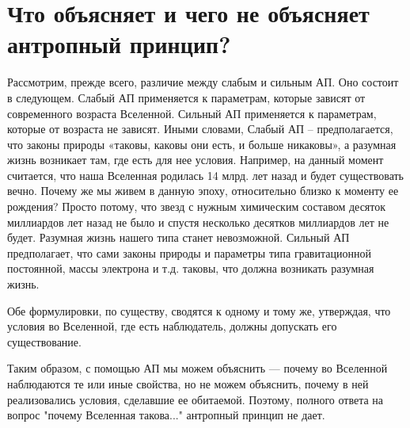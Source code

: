 \chapter{ Что объясняет и чего не объясняет антропный принцип?} \label{chapt5}

Рассмотрим, прежде всего, различие между слабым и сильным АП. Оно состоит в следующем. Слабый АП применяется к параметрам, которые зависят от современного возраста Вселенной. Сильный АП применяется к параметрам, которые от возраста не зависят. Иными словами, Слабый АП – предполагается, что законы природы «таковы, каковы они есть, и больше никаковы», а разумная жизнь возникает там, где есть для нее условия. Например, на данный момент считается, что наша Вселенная родилась 14 млрд. лет назад и будет существовать вечно. Почему же мы живем в данную эпоху, относительно близко к моменту ее рождения? Просто потому, что звезд с нужным химическим составом десяток миллиардов лет назад не было и спустя несколько десятков миллиардов лет не будет. Разумная жизнь нашего типа станет невозможной. Сильный АП предполагает, что сами законы природы и параметры типа гравитационной постоянной, массы электрона и т.д. таковы, что должна возникать разумная жизнь.


Обе формулировки, по существу, сводятся к одному и тому же, утверждая, что условия во Вселенной, где есть наблюдатель, должны допускать его существование. 


Таким образом, с помощью АП мы можем объяснить  --- почему во Вселенной наблюдаются те или иные свойства, но не можем объяснить, почему в ней реализовались условия, сделавшие ее обитаемой. Поэтому, полного ответа на вопрос "почему Вселенная такова..." антропный принцип не дает.



\clearpage
